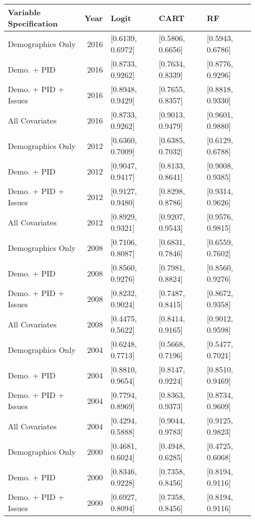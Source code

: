 \begin{longtable}{lrlll}
  \toprule
Variable Specification & Year & Logit & CART & RF \\ 
  \midrule
Demographics Only & 2016 & [0.6139, 0.6972] & [0.5806, 0.6656] & [0.5943, 0.6786] \\ 
  Demo. + PID & 2016 & [0.8733, 0.9262] & [0.7634, 0.8339] & [0.8776, 0.9296] \\ 
  Demo. + PID + Issues & 2016 & [0.8948, 0.9429] & [0.7655, 0.8357] & [0.8818, 0.9330] \\ 
  All Covariates & 2016 & [0.8733, 0.9262] & [0.9013, 0.9479] & [0.9601, 0.9880] \\ 
  Demographics Only & 2012 & [0.6360, 0.7009] & [0.6385, 0.7032] & [0.6129, 0.6788] \\ 
  Demo. + PID & 2012 & [0.9047, 0.9417] & [0.8133, 0.8641] & [0.9008, 0.9385] \\ 
  Demo. + PID + Issues & 2012 & [0.9127, 0.9480] & [0.8298, 0.8786] & [0.9314, 0.9626] \\ 
  All Covariates & 2012 & [0.8929, 0.9321] & [0.9207, 0.9543] & [0.9576, 0.9815] \\ 
  Demographics Only & 2008 & [0.7106, 0.8087] & [0.6831, 0.7846] & [0.6559, 0.7602] \\ 
  Demo. + PID & 2008 & [0.8560, 0.9276] & [0.7981, 0.8824] & [0.8560, 0.9276] \\ 
  Demo. + PID + Issues & 2008 & [0.8232, 0.9024] & [0.7487, 0.8415] & [0.8672, 0.9358] \\ 
  All Covariates & 2008 & [0.4475, 0.5622] & [0.8414, 0.9165] & [0.9012, 0.9598] \\ 
  Demographics Only & 2004 & [0.6248, 0.7713] & [0.5668, 0.7196] & [0.5477, 0.7021] \\ 
  Demo. + PID & 2004 & [0.8810, 0.9654] & [0.8147, 0.9224] & [0.8510, 0.9469] \\ 
  Demo. + PID + Issues & 2004 & [0.7794, 0.8969] & [0.8363, 0.9373] & [0.8734, 0.9609] \\ 
  All Covariates & 2004 & [0.4294, 0.5888] & [0.9044, 0.9783] & [0.9125, 0.9823] \\ 
  Demographics Only & 2000 & [0.4681, 0.6024] & [0.4948, 0.6285] & [0.4725, 0.6068] \\ 
  Demo. + PID & 2000 & [0.8346, 0.9228] & [0.7358, 0.8456] & [0.8194, 0.9116] \\ 
  Demo. + PID + Issues & 2000 & [0.6927, 0.8094] & [0.7358, 0.8456] & [0.8194, 0.9116] \\ 

\end{longtable}
